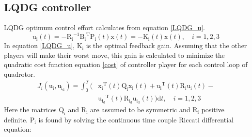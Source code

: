 \documentclass[conference]{IEEEtran}
\begin{document}
\subsection{LQDG controller}
LQDG optimum control effort calculates from equation \eqref{LQDG_u}.
\begin{equation}\label{LQDG_u}
	\boldsymbol{\mathrm{u_i}}(t) = -\boldsymbol{\mathrm{R_{i}}}^{-1}\boldsymbol{\mathrm{B_i}}^\mathrm{T}\boldsymbol{\mathrm{P_{i}}}(t)\boldsymbol{\mathrm{x}}(t) = -\boldsymbol{\mathrm{K_{i}}}(t)\boldsymbol{\mathrm{x}}(t),\quad i = 1, 2, 3
\end{equation}
In equation \eqref{LQDG_u}, $\boldsymbol{\mathrm{K_{i}}}$ is the optimal feedback gain. Assuming that the other players will make their worst move, this gain is calculated to minimize the quadratic cost function equation \eqref{cost} of controller player for each control loop of quadrotor.
\begin{equation}\label{cost}
    \begin{split}
        J_i( \boldsymbol{\mathrm{u_i}},  \boldsymbol{\mathrm{u_{i_d}}}) = \int_{0}^{T}\biggl (&\boldsymbol{\mathrm{x_i}} ^\mathrm{T}(t) \boldsymbol{\mathrm{Q_i}} \boldsymbol{\mathrm{x_i}}(t)+
        \boldsymbol{\mathrm{u_i}} ^\mathrm{T}(t) \boldsymbol{\mathrm{R_{i}}} \boldsymbol{\mathrm{u_i}}(t)-\\
        &\boldsymbol{\mathrm{u_{i_d}}} ^\mathrm{T}(t)\boldsymbol{\mathrm{ R_{i_d} u_{i_d}}}(t)
        \biggl )\mathrm{d}t, \quad i = 1, 2, 3 
    \end{split} 
\end{equation}
Here the matrices $\boldsymbol{\mathrm{Q_i}}$ and  $\boldsymbol{\mathrm{R_{i}}}$ are assumed to be symmetric and $\boldsymbol{\mathrm{R_{i}}}$ positive definite.
$\boldsymbol{\mathrm{P_{i}}}$ is found by solving the continuous time couple Riccati differential equation:
\end{document}
